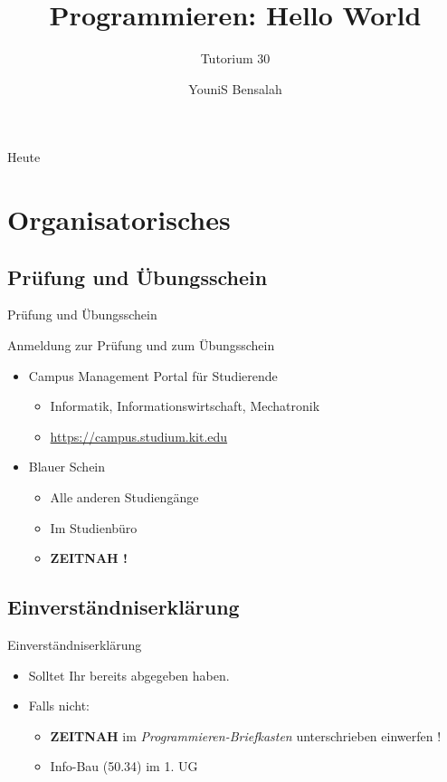 \documentclass[18pt]{beamer}
\title[Hello World]{Programmieren: Hello World}
\subtitle{Tutorium 30}
\author{YouniS Bensalah}
\institute{Chair for Software Design and Quality}
\begin{document}

\begin{frame}
\titlepage
\end{frame}

\begin{frame}{Heute}
\tableofcontents
\end{frame}

\section{Organisatorisches}

\subsection{Prüfung und Übungsschein}
\begin{frame}{Prüfung und Übungsschein}
    \begin{block}{Anmeldung zur Prüfung und zum Übungsschein}
        \begin{itemize}
            \item Campus Management Portal für Studierende
            \begin{itemize}
                \item Informatik, Informationswirtschaft, Mechatronik
                \item \url{https://campus.studium.kit.edu}
            \end{itemize}
            \pause

            \item Blauer Schein
            \begin{itemize}
                \item Alle anderen Studiengänge
                \item Im Studienbüro
                \pause
                \item \textbf{ZEITNAH !}
            \end{itemize}
        \end{itemize}
    \end{block}
\end{frame}

\subsection{Einverständniserklärung}
\begin{frame}{Einverständniserklärung}
    \begin{itemize}
        \item Solltet Ihr bereits abgegeben haben.
        \pause
        \item Falls nicht:
        \begin{itemize}
            \item \textbf{ZEITNAH} im \textit{Programmieren-Briefkasten} unterschrieben einwerfen !
            \item Info-Bau (50.34) im 1. UG
        \end{itemize}
    \end{itemize}
\end{frame}
\end{document}
